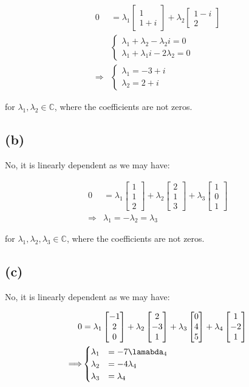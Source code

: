 \documentclass[11pt]{article}
\providecommand{\qbm}[1]{\begin{bmatrix} #1 \end{bmatrix}}
\begin{document}
\begin{align*}
    0 &= \lambda_1 \qbm{1 \\ 1+i} + \lambda_2 \qbm{1-i \\ 2} \\
    &\begin{cases}
        \lambda_1 + \lambda_2 - \lambda_2 i = 0 \\
        \lambda_1 + \lambda_1 i - 2\lambda_2 = 0
    \end{cases} \\
    \Longrightarrow& \begin{cases}
            \lambda_1 = -3 + i \\
            \lambda_2 = 2 + i
        \end{cases}
\end{align*}

for $\lambda_1, \lambda_2 \in \mathbb{C}$, where the coefficients are not zeros.

\subsection*{(b)}

No, it is linearly dependent as we may have:


\begin{align*}
    0 &= \lambda_1 \qbm{1\\1\\2} + \lambda_2 \qbm{2 \\1 \\3} + \lambda_3 \qbm{1 \\ 0 \\1} \\
    \Longrightarrow& \lambda_1 = -\lambda_2 = \lambda_3
\end{align*}


for $\lambda_1, \lambda_2, \lambda_3 \in \mathbb{C}$, where the coefficients are not zeros.

\subsection*{(c)}

No, it is linearly dependent as we may have:


\begin{align*}
    0 &= \lambda_1 \qbm{ -1 \\ 2 \\ 0} + \lambda_2 \qbm{ 2 \\ -3 \\ 1 } + \lambda_3 \qbm{ 0 \\ 4 \\ 5 } + \lambda_4 \qbm{ 1 \\ -2 \\ 1 }\\
    \Longrightarrow& \begin{cases}
            \lambda_1 &= -7 \lamabda_4 \\
            \lambda_2 &= -4 \lambda_4  \\
            \lambda_3 &= \lambda_4
    \end{cases}
\end{align*}
\end{document}
